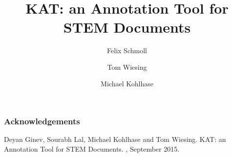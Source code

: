 \documentclass[a4paper]{article}
\title{KAT: an Annotation Tool for STEM Documents}
\author{
Felix Schmoll
\and
Tom Wiesing
\and
Michael Kohlhase
}
\begin{document}
\maketitle

\begin{abstract}

\end{abstract}
\vskip 32pt









\subsubsection{Acknowledgements}





% 
%

\begin{thebibliography}{Com79}

Deyan Ginev, Sourabh Lal, Michael Kohlhase and Tom Wiesing.
\newblock KAT: an Annotation Tool for STEM Documents.
, September 2015.


\end{thebibliography}
\end{document}
